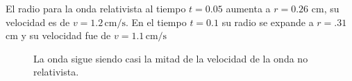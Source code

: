 \documentclass[12pt,a4paper]{book}
\begin{document}
El radio para la onda relativista al tiempo $t = 0.05$ aumenta a $r = 0.26 $ cm, su velocidad es de $v = 1.2 \, \mathrm{cm}/\mathrm{s}$. En el tiempo $t = 0.1$ su radio se expande a $r = .31$ cm y su velocidad fue de $v = 1.1 \, \mathrm{cm}/\mathrm{s}$

\begin{figure}[H]
\centering
{}
\caption{La onda sigue siendo casi la mitad de la velocidad de la onda no relativista.}  \label{fig:HLL-prueba2}
\end{figure}
\end{document}
